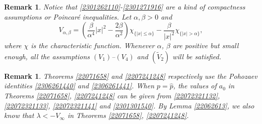 \documentclass[10pt]{article}
\numberwithin{equation}{section}
\newtheorem{remark}[theorem]{Remark}
\numberwithin{equation}{section}
\begin{document}
\begin{remark}\label{2302011420}
Notice that \eqref{2301262110}-\eqref{2301271916} are a kind of compactness assumptions or Poincar\'e inequalities. Let $\alpha, \beta>0$ and
\[
V_{\alpha,\beta}=\left(\frac{\beta}{\alpha^4}|x|^2-\frac{2\beta}{\alpha^2}\right)\chi_{\{|x|\le \alpha\}} -\frac{\beta}{|x|^2} \chi_{\{|x|> \alpha\}},
\]
where $\chi$ is the characteristic function. Whenever $\alpha$, $\beta$ are positive but small enough, all the assumptions $(V_1)$--$(V_4)$ and $(\widetilde{V}_2)$ will be satisfied.
\end{remark}
\begin{remark}
Theorems \ref{22071658} and \ref{2207241248} respectively use the Pohozaev identities \eqref{2306261440} and \eqref{2306261441}. When $p=\hat{p}$, the values of $a_0$ in Theorems \ref{22071658}, \ref{2207241248} can be given from \eqref{22072321132}, \eqref{22072321133}, \eqref{22072321141} and \eqref{2301301540}. By Lemma \ref{22062613}, we also know that $\lambda<-V_\infty$ in Theorems \ref{22071658}, \ref{2207241248}.
\end{remark}
\end{document}
